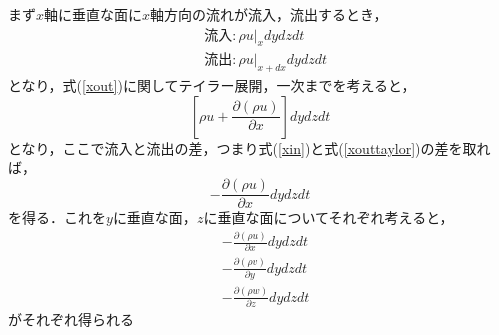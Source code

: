 \documentclass{jsarticle}
\newcommand{\pfrac}[2]{\frac{\partial{}{#1}}{\partial{}{#2}}}
\begin{document}
まず$x$軸に垂直な面に$x$軸方向の流れが流入，流出するとき，
\begin{align}
  &流入:\rho{}u|_{x}dydzdt\label{xin}\\
  &流出:\rho{}u|_{x+dx}dydzdt\label{xout}
\end{align}
となり，式(\ref{xout})に関してテイラー展開，一次までを考えると，
\begin{equation}
  \left[\rho{}u+\pfrac{(\rho{}u)}{x}\right]dydzdt\label{xouttaylor}
\end{equation}
となり，ここで流入と流出の差，つまり式(\ref{xin})と式(\ref{xouttaylor})の差を取れば，
\begin{equation}
  -\pfrac{(\rho{}u)}{x}dydzdt
\end{equation}
を得る．これを$y$に垂直な面，$z$に垂直な面についてそれぞれ考えると，
\begin{align}
  &-\pfrac{(\rho{}u)}{x}dydzdt\\
  &-\pfrac{(\rho{}v)}{y}dydzdt\\
  &-\pfrac{(\rho{}w)}{z}dydzdt
\end{align}
がそれぞれ得られる
\end{document}
